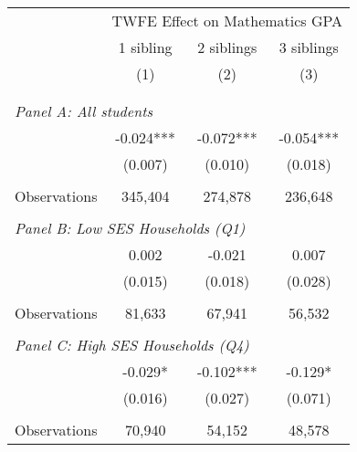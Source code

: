 \makeatletter
{}
{
\makeatother
\begin{tabular}{lccc}
\toprule
\cmidrule(lr){2-4}
& \multicolumn{3}{c}{TWFE Effect on Mathematics GPA} \\
\cmidrule(lr){2-4}
& 1 sibling & 2 siblings & 3 siblings  \\
\cmidrule(lr){2-2} \cmidrule(lr){3-3} \cmidrule(lr){4-4}
& (1) & (2) & (3)\\
\bottomrule
&  &  &  \\
&  &  &   \\
\multicolumn{4}{l}{\textit{Panel A: All students}} \\
\hspace{3mm}        &      -0.024***&      -0.072***&      -0.054***\\
                    &     (0.007)   &     (0.010)   &     (0.018)   \\
                    &               &               &               \\
\hspace{3mm}Observations&     345,404   &     274,878   &     236,648   \\
 
&  &  &   \\
\multicolumn{4}{l}{\textit{Panel B: Low SES Households (Q1)}} \\
\hspace{3mm}        &       0.002   &      -0.021   &       0.007   \\
                    &     (0.015)   &     (0.018)   &     (0.028)   \\
                    &               &               &               \\
\hspace{3mm}Observations&      81,633   &      67,941   &      56,532   \\
 
&  &  &   \\
\multicolumn{4}{l}{\textit{Panel C: High SES Households (Q4)}} \\
\hspace{3mm}        &      -0.029*  &      -0.102***&      -0.129*  \\
                    &     (0.016)   &     (0.027)   &     (0.071)   \\
                    &               &               &               \\
\hspace{3mm}Observations&      70,940   &      54,152   &      48,578   \\
 

\end{tabular}}
